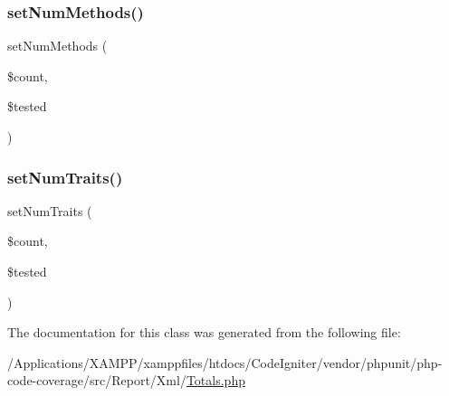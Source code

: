 \subsubsection{\texorpdfstring{set\+Num\+Methods()}{setNumMethods()}}
{\footnotesize\ttfamily set\+Num\+Methods (\begin{DoxyParamCaption}\item[{}]{\$count,  }\item[{}]{\$tested }\end{DoxyParamCaption})}

\mbox{\label{class_sebastian_bergmann_1_1_code_coverage_1_1_report_1_1_xml_1_1_totals_a5d475991287d003bbdcfcbbde8ceb2e6}} 
\subsubsection{\texorpdfstring{set\+Num\+Traits()}{setNumTraits()}}
{\footnotesize\ttfamily set\+Num\+Traits (\begin{DoxyParamCaption}\item[{}]{\$count,  }\item[{}]{\$tested }\end{DoxyParamCaption})}



The documentation for this class was generated from the following file\+:\begin{DoxyCompactItemize}
\item 
/\+Applications/\+X\+A\+M\+P\+P/xamppfiles/htdocs/\+Code\+Igniter/vendor/phpunit/php-\/code-\/coverage/src/\+Report/\+Xml/\mbox{\hyperlink{_totals_8php}{Totals.\+php}}\end{DoxyCompactItemize}
